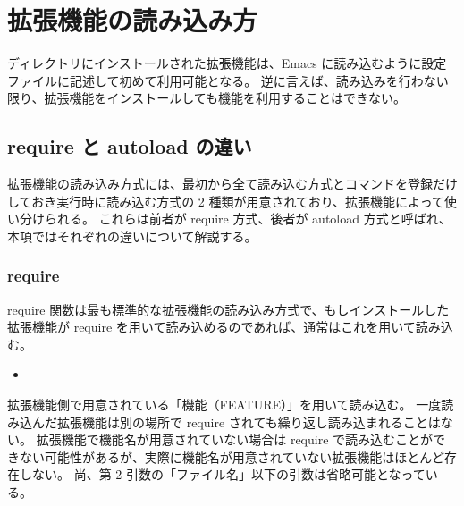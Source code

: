 \section{拡張機能の読み込み方}
ディレクトリにインストールされた拡張機能は、Emacs に読み込むように設定ファイルに記述して初めて利用可能となる。
逆に言えば、読み込みを行わない限り、拡張機能をインストールしても機能を利用することはできない。
\subsection{require と autoload の違い}
拡張機能の読み込み方式には、最初から全て読み込む方式とコマンドを登録だけしておき実行時に読み込む方式の 2 種類が用意されており、拡張機能によって使い分けられる。
これらは前者が require 方式、後者が autoload 方式と呼ばれ、本項ではそれぞれの違いについて解説する。
\subsubsection{require}
require 関数は最も標準的な拡張機能の読み込み方式で、もしインストールした拡張機能が require を用いて読み込めるのであれば、通常はこれを用いて読み込む。
\begin{itemize}\setlength{\leftskip}{-1.00zw}%
\item[] \texttt{}
\end{itemize}
拡張機能側で用意されている「機能（FEATURE）」を用いて読み込む。
一度読み込んだ拡張機能は別の場所で require されても繰り返し読み込まれることはない。
拡張機能で機能名が用意されていない場合は require で読み込むことができない可能性があるが、実際に機能名が用意されていない拡張機能はほとんど存在しない。
尚、第 2 引数の「ファイル名」以下の引数は省略可能となっている。\\

